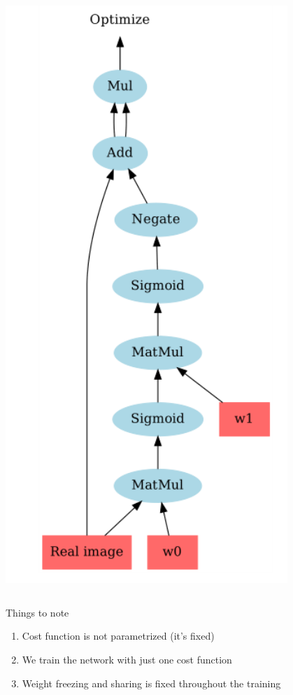 \documentclass{Bredelebeamer}
\begin{document}
\begin{frame}
\begin{columns}
\begin{column}{0.34\textwidth}
		\includegraphics[width=0.8\textwidth]{sq_diff_all.png}
	\end{column}
	\end{columns}
	\pause[4]
	\begin{block}{Things to note}
	\begin{enumerate}
		\item Cost function is not parametrized (it's fixed)
		\item We train the network with just one cost function
		\item Weight freezing and sharing is fixed throughout the training
	\end{enumerate}
	\end{block}
\end{frame}
\end{document}
